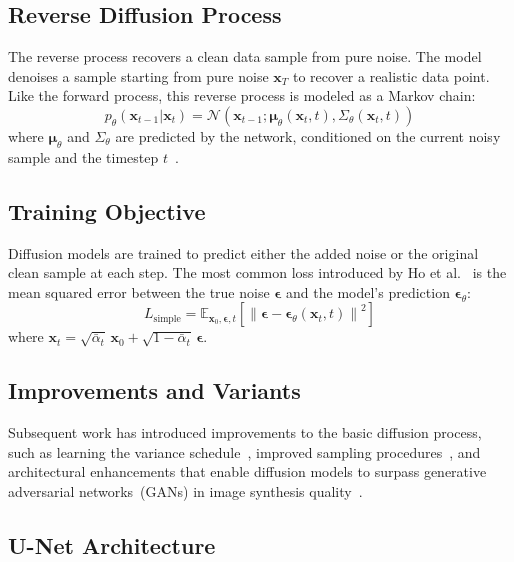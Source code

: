 \subsection{Reverse Diffusion Process}
\label{subsec:reverse_diffusion_process}

The reverse process recovers a clean data sample from pure noise. The model denoises a sample starting from pure noise $\mathbf{x}_T$ to recover a realistic data point.
Like the forward process, this reverse process is modeled as a Markov chain:
\[
	p_\theta(\mathbf{x}_{t-1} | \mathbf{x}_t) = \mathcal{N}(\mathbf{x}_{t-1}; \boldsymbol{\mu}_\theta(\mathbf{x}_t, t), \Sigma_\theta(\mathbf{x}_t, t))
\]
where $\boldsymbol{\mu}_\theta$ and $\Sigma_\theta$ are predicted by the network, conditioned on the current noisy sample and the timestep $t$~\cite{ho2020ddpm}.

\subsection{Training Objective}
\label{subsec:training_objective}

Diffusion models are trained to predict either the added noise or the original clean sample at each step. The most common loss introduced by Ho et al.~\cite{ho2020ddpm} is the mean squared error between the true noise $\boldsymbol{\epsilon}$ and the model's prediction $\boldsymbol{\epsilon}_\theta$:
\[
	L_{\text{simple}} = \mathbb{E}_{\mathbf{x}_0, \boldsymbol{\epsilon}, t} \left[ \left\| \boldsymbol{\epsilon} - \boldsymbol{\epsilon}_\theta(\mathbf{x}_t, t) \right\|^2 \right]
\]
where $\mathbf{x}_t = \sqrt{\bar{\alpha}_t}\,\mathbf{x}_0 + \sqrt{1 - \bar{\alpha}_t}\,\boldsymbol{\epsilon}$.

\subsection{Improvements and Variants}
\label{subsec:improvements_variants}

Subsequent work has introduced improvements to the basic diffusion process, such as learning the variance schedule~\cite{nichol2021improved}, improved sampling procedures~\cite{song2021denoising}, and architectural enhancements that enable diffusion models to surpass generative adversarial networks~(GANs) in image synthesis quality~\cite{dhariwal2021diffusion}.

\subsection{U-Net Architecture}
\label{subsec:unet_architecture}

